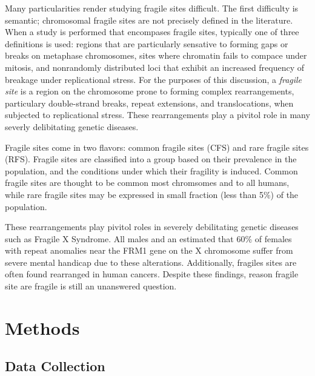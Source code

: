 \documentclass[phd,tocprelim]{cornell}
\begin{document}
Many particularities render studying fragile sites difficult.  The
first difficulty is semantic; chromosomal fragile sites are not precisely
defined in the literature.  When a study is performed that encompases fragile
sites, typically one of three definitions is used: regions that are particularly
sensative to forming gaps or breaks on metaphase chromosomes\cite{glover2005},
sites where chromatin fails to compace under mitosis\cite{leyden2008}, and
nonrandomly distributed loci that exhibit an increased frequency of breakage
under replicational stress\cite{franchitto2013}.  For the purposes of this
discussion, a \textit{fragile site} is a region on the chromosome prone to
forming complex rearrangements, particulary double-strand breaks, repeat
extensions, and translocations, when subjected to replicational stress.  These
rearrangements play a pivitol role in many severly delibitating genetic
diseases.

Fragile sites come in two flavors: common fragile sites (CFS) and rare fragile
sites (RFS).  Fragile sites are classified into a group based on their
prevalence in the population, and the conditions under which their fragility
is induced\cite{leyden2008}.  Common fragile sites are thought to be common
most chromsomes and to all humans, while rare fragile sites may be expressed
in small fraction (less than 5\%) of the population\cite{wells2006}.

These
rearrangements play pivitol roles in severely debilitating genetic diseases
such as Fragile X Syndrome.  All males and an estimated that 60\% of females
with repeat anomalies near the FRM1 gene on the X chromosome suffer
from severe mental handicap due to these alterations\cite{sutherland1995}.
Additionally, fragiles sites are often found rearranged in human
cancers\cite{glover2005}.  Despite these findings, reason fragile site are
fragile is still an unanswered question.



\chapter{Methods}

\section{Data Collection}
\end{document}

